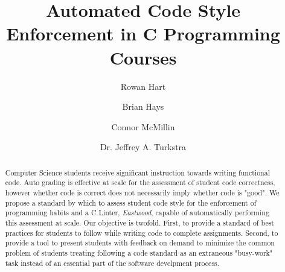 \documentclass[sigconf]{acmart}
\begin{document}
\title{Automated Code Style Enforcement in C Programming Courses}


\author{Rowan Hart}

\author{Brian Hays}

\author{Connor McMillin}
  
\author{Dr. Jeffrey A. Turkstra}
\renewcommand{\shortauthors}{Hart and Turkstra, et. al}

\begin{abstract}
Computer Science students receive significant instruction towards writing functional code.
Auto grading is effective at scale \cite{doi:10.1080/08993400500150747} for the assessment
of student code correctness, however whether code is correct does not necessarily imply
whether code is "good". We propose a standard by which to assess student code style for
the enforcement of programming habits and a C Linter, \textit{Eastwood}, capable of
automatically performing this assessment at scale. Our objective is twofold. First, to
provide a standard of best practices for students to follow while writing code to
complete assignments. Second, to provide a tool to present students with feedback
on demand to minimize the common problem of students treating following a code standard
as an extraneous "busy-work" task instead of an essential part of the software
develpment process. %
\end{abstract}
\end{document}
